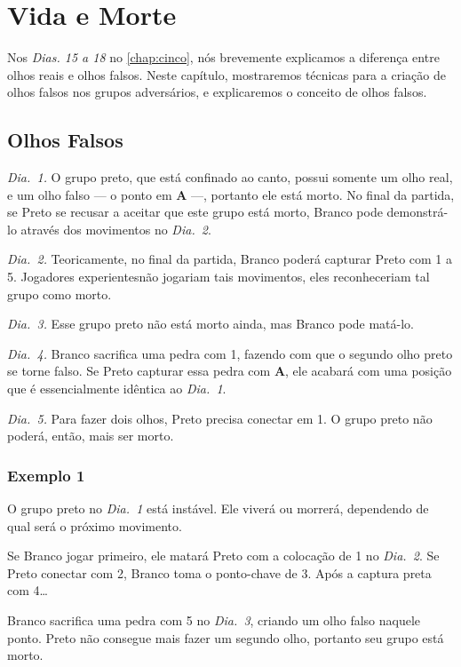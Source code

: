 \chapter{Vida e Morte}

Nos \emph{Dias. 15 a 18} no \autoref{chap:cinco}, nós brevemente explicamos a diferença entre olhos reais e olhos falsos. Neste capítulo, mostraremos técnicas para a criação de olhos falsos nos grupos adversários, e explicaremos o conceito de olhos falsos.

\section{Olhos Falsos}

\emph{Dia.\@~1.} O grupo preto, que está confinado ao canto, possui somente um olho real, e um olho falso --- o ponto em \textbf{A} ---, portanto ele está morto. No final da partida, se Preto se recusar a aceitar que este grupo está morto, Branco pode demonstrá-lo através dos movimentos no \emph{Dia.\@~2}.

\emph{Dia.\@~2.} Teoricamente, no final da partida, Branco poderá capturar Preto com 1 a 5. Jogadores experientesnão jogariam tais movimentos, eles reconheceriam tal grupo como morto.

\emph{Dia.\@~3.} Esse grupo preto não está morto ainda, mas Branco pode matá-lo.

\emph{Dia.\@~4.} Branco sacrifica uma pedra com 1, fazendo com que o segundo olho preto se torne falso. Se Preto capturar essa pedra com \textbf{A}, ele acabará com uma posição que é essencialmente idêntica ao \emph{Dia.\@~1}.

\emph{Dia.\@~5.} Para fazer dois olhos, Preto precisa conectar em 1. O grupo preto não poderá, então, mais ser morto.

\subsection{Exemplo 1}

O grupo preto no \emph{Dia.\@~1} está instável. Ele viverá ou morrerá, dependendo de qual será o próximo movimento.

Se Branco jogar primeiro, ele matará Preto com a colocação de 1 no \emph{Dia.\@~2}. Se Preto conectar com 2, Branco toma o ponto-chave de 3. Após a captura preta com 4\ldots

Branco sacrifica uma pedra com 5 no \emph{Dia.\@~3}, criando um olho falso naquele ponto. Preto não consegue mais fazer um segundo olho, portanto seu grupo está morto.

